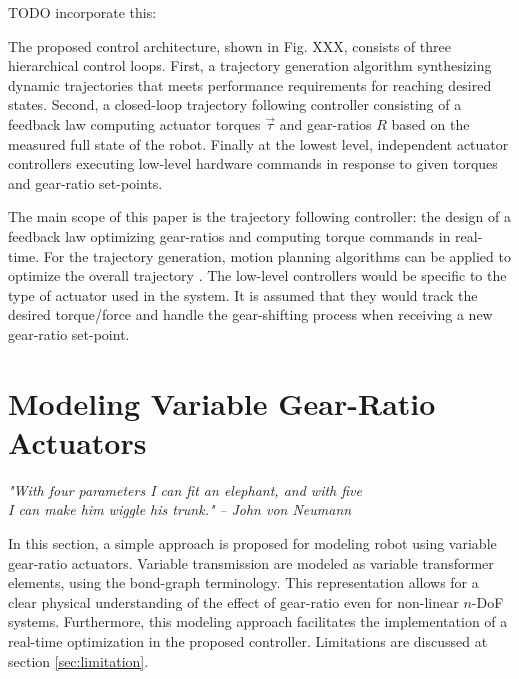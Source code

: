 TODO incorporate this:

The proposed control architecture, shown in Fig. XXX, consists of three hierarchical control loops. First, a trajectory generation algorithm synthesizing dynamic trajectories that meets performance requirements for reaching desired states. Second, a closed-loop trajectory following controller consisting of a feedback law computing actuator torques $\vec{\tau}$ and gear-ratios $R$ based on the measured full state of the robot. Finally at the lowest level, independent actuator controllers executing low-level hardware commands in response to given torques and gear-ratio set-points. 

The main scope of this paper is the trajectory following controller: the design of a feedback law optimizing gear-ratios and computing torque commands in real-time. For the trajectory generation, motion planning algorithms can be applied to optimize the overall trajectory \cite{lavalle_planning_2006}.  The low-level controllers would be specific to the type of actuator used in the system. It is assumed that they would track the desired torque/force and handle the gear-shifting process when receiving a new gear-ratio set-point. 


\newpage

\section{Modeling Variable Gear-Ratio Actuators}
\label{sec:model}

\begin{flushright}
{%
\textit{"With four parameters I can fit an elephant, and with five \\ I can make him wiggle his trunk."}
 }
 \emph{-- John von Neumann}
\end{flushright}
\vspace{+10pt}

In this section, a simple approach is proposed for modeling robot using variable gear-ratio actuators. Variable transmission are modeled as variable transformer elements, using the bond-graph terminology. This representation allows for a clear physical understanding of the effect of gear-ratio even for non-linear $n$-DoF systems. Furthermore, this modeling approach facilitates the implementation of a real-time optimization in the proposed controller. Limitations are discussed at section \ref{sec:limitation}.

